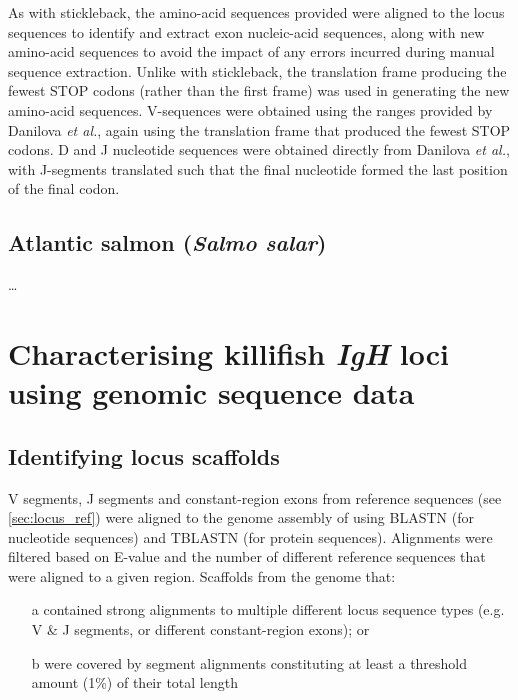 As with stickleback, the amino-acid sequences provided were aligned to the locus sequences to identify and extract exon nucleic-acid sequences, along with new amino-acid sequences to avoid the impact of any errors incurred during manual sequence extraction. Unlike with stickleback, the translation frame producing the fewest STOP codons (rather than the first frame) was used in generating the new amino-acid sequences. V-sequences were obtained using the ranges provided by Danilova \textit{et al.}, again using the translation frame that produced the fewest STOP codons. D and J nucleotide sequences were obtained directly from Danilova \textit{et al.}, with J-segments translated such that the final nucleotide formed the last position of the final codon. 


\subsection{Atlantic salmon (\textit{Salmo salar})}

\dots

\section{Characterising killifish \textit{IgH} loci using genomic sequence data}

\subsection{Identifying locus scaffolds}

V segments, J segments and constant-region exons from reference sequences (see \autoref{sec:locus_ref}) were aligned to the genome assembly of %
using BLASTN (for nucleotide sequences) and TBLASTN (for protein sequences). Alignments were filtered based on E-value and the number of different reference sequences that were aligned to a given region. Scaffolds from the genome that:

\begin{enumerate}
\item[a] contained strong alignments to multiple different locus sequence types (e.g. V & J segments, or different constant-region exons); or
\item[b] were covered by segment alignments constituting at least a threshold amount (1\%) of their total length
\end{enumerate}

